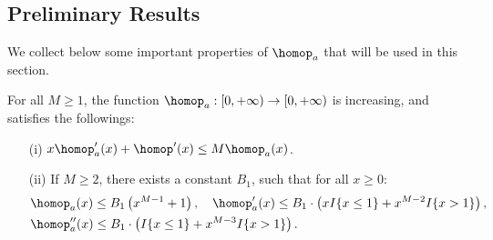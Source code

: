 \subsection{Preliminary Results} \label{sec:proof:gd:prelim}
We collect below some important properties of $\homop_a$ that will be used in this section.
\begin{lemma}\label{lem:modified_p_a}
    For all $M \ge 1$, the function $\homop_a: [0, +\infty) \to [0, +\infty)$ is increasing, and satisfies the followings:
    \begin{itemize}
        \item [(i)] $x \homop_a' (x) + \homop' (x) \le M \homop_a (x)$.
        \item [(ii)] If $M \ge 2$, there exists a constant $B_1$, such that for all $x \ge 0$:
        \begin{align}
            & \homop_a (x) \le B_1 \left( x^{M-1} + 1 \right), \quad \homop_a' (x) \le B_1 \cdot \left(x I \{ x \le 1 \} + x^{M-2} I \{ x > 1 \} \right), \\
            & \homop_a'' (x) \le B_1 \cdot \left( I \{ x \le 1 \} + x^{M-3} I \{ x > 1 \} \right).
        \end{align}
    \end{itemize}
\end{lemma}
%
